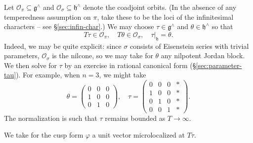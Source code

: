 \documentclass[reqno]{amsart}
\theoremstyle{plain} \newtheorem{theorem} {Theorem}
\theoremstyle{definition} \newtheorem{definition} [theorem] {Definition}
\theoremstyle{itplain} %
\numberwithin{equation}{section}
\numberwithin{theorem}{section}
\begin{document}
Let $\mathcal{O}_\pi \subseteq \mathfrak{g}^\wedge$ and $\mathcal{O}_\sigma \subseteq \mathfrak{h}^\wedge$ denote the coadjoint orbits.  (In the absence of any temperedness assumption on $\pi$, take these to be the loci of the infinitesimal characters -- see \S\ref{sec:infin-char}.)  We may choose $\tau \in \mathfrak{g}^\wedge$ and $\theta \in \mathfrak{h}^\wedge$ so that
\begin{equation*}
  T \tau \in \mathcal{O}_\pi, \quad
  T \theta \in \mathcal{O}_{\sigma},
  \quad
  \tau|_{\mathfrak{h}} = \theta.
\end{equation*}
Indeed, we may be quite explicit: since $\sigma$ consists of Eisenstein series with trivial parameters, $\mathcal{O}_\sigma$ is the nilcone, so we may take for $\theta$ any nilpotent Jordan block.  We then solve for $\tau$ by an exercise in rational canonical form (\S\ref{sec:parameter-tau}).  For example, when $n = 3$, we might take
\begin{equation*}
  \theta = \begin{pmatrix}
    0 & 0 & 0 \\
    1 & 0 & 0 \\
    0 & 1 & 0
  \end{pmatrix},
  \quad
  \tau = \begin{pmatrix}
    0 & 0 & 0 & \ast \\
    1 & 0 & 0 & \ast \\
    0 & 1 & 0 & \ast \\
    0 & 0 & 1 & \ast
  \end{pmatrix}.
\end{equation*}
The normalization is such that $\tau$ remains bounded as $T \rightarrow \infty$.

We take for the cusp form $\varphi$ a unit vector microlocalized at $T \tau$.  
\end{document}
